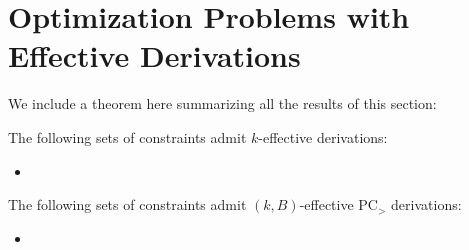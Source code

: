 \section{Optimization Problems with Effective Derivations}
We include a theorem here summarizing all the results of this section:
\begin{theorem}
The following sets of constraints admit $k$-effective derivations:
\begin{itemize}
\item
\end{itemize}
The following sets of constraints admit $(k,B)$-effective PC$_>$ derivations:
\begin{itemize}
\item
\end{itemize}
\end{theorem}
